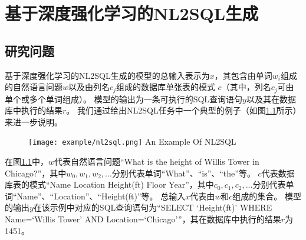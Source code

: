 
\chapter{基于深度强化学习的NL2SQL生成}
\label{chap:enl2sql}

\section{研究问题}


基于深度强化学习的NL2SQL生成的模型的总输入表示为$x$，其包含由单词$w_{i}$组成的自然语言问题$w$以及由列名$c_{j}$组成的数据库单张表的模式 $c$（其中，列名$c_{j}$可由单个或多个单词组成）。
模型的输出为一条可执行的SQL查询语句$y$以及其在数据库中执行的结果$r$。
我们通过给出NL2SQL任务中一个典型的例子（如图\ref{fig:nl2sqlexample}所示）来进一步说明。

\begin{figure}[!htp]
    \centering
    \texttt{[image: example/nl2sql.png]}
      {An Example Of NL2SQL}
    \label{fig:nl2sqlexample}
  \end{figure}

在图\ref{fig:nl2sqlexample}中，$w$代表自然语言问题“What is  the height of Willis Tower in Chicago?”，其中$w_0,w_1,w_2,...$分别代表单词“What”、“is”、“the”等。
$c$代表数据库表的模式“Name Location Height(ft) Floor Year”，其中$c_0,c_1,c_2,...$分别代表单词“Name”、“Location”、“Height(ft)”等。
总输入$x$代表由$w$和$c$组成的集合。
模型的输出$y$在该示例中对应的SQL查询语句为“SELECT ‘Height(ft)’ WHERE Name=‘Willis Tower’ AND Location=‘Chicago’”，其在数据库中执行的结果$r$为1451。


